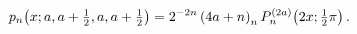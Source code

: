 \[\mathop{p_{n}\/}\nolimits\!\left(x;a,a+\tfrac{1}{2},a,a+\tfrac{1}{2}\right)=2^%
{-2n}\left(4a+n\right)_{n}\mathop{P^{(2a)}_{n}\/}\nolimits\!\left(2x;\tfrac{1}%
{2}\pi\right).\]